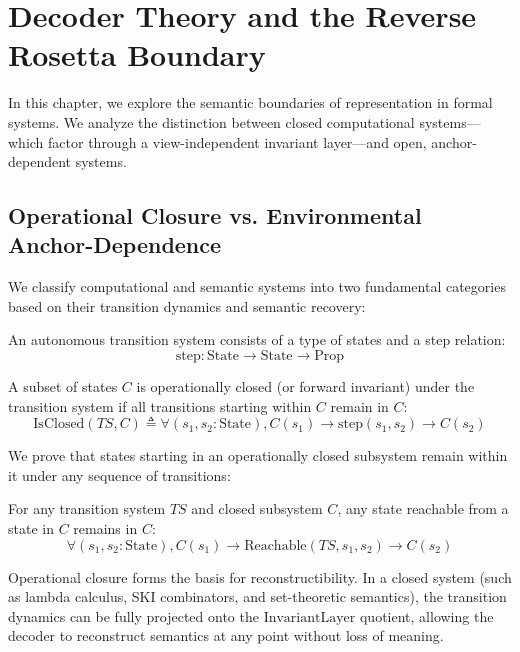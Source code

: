 \chapter{Decoder Theory and the Reverse Rosetta Boundary}

In this chapter, we explore the semantic boundaries of representation in formal systems. We analyze the distinction between closed computational systems—which factor through a view-independent invariant layer—and open, anchor-dependent systems.

\section{Operational Closure vs. Environmental Anchor-Dependence}

We classify computational and semantic systems into two fundamental categories based on their transition dynamics and semantic recovery:

\begin{definition}
An autonomous transition system consists of a type of states and a step relation:
$$\text{step} : \text{State} \to \text{State} \to \text{Prop}$$
\end{definition}

\begin{definition}
A subset of states $C$ is operationally closed (or forward invariant) under the transition system if all transitions starting within $C$ remain in $C$:
$$\text{IsClosed}(TS, C) \triangleq \forall (s_1, s_2 : \text{State}), C(s_1) \to \text{step}(s_1, s_2) \to C(s_2)$$
\end{definition}

We prove that states starting in an operationally closed subsystem remain within it under any sequence of transitions:

\begin{theorem}
For any transition system $TS$ and closed subsystem $C$, any state reachable from a state in $C$ remains in $C$:
$$\forall (s_1, s_2 : \text{State}), C(s_1) \to \text{Reachable}(TS, s_1, s_2) \to C(s_2)$$
\end{theorem}

Operational closure forms the basis for reconstructibility. In a closed system (such as lambda calculus, SKI combinators, and set-theoretic semantics), the transition dynamics can be fully projected onto the $\text{InvariantLayer}$ quotient, allowing the decoder to reconstruct semantics at any point without loss of meaning.

